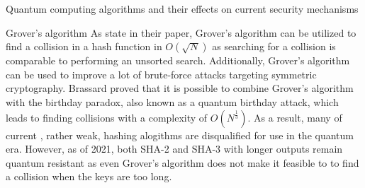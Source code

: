 \documentclass[aps,preprintnumbers,twocolumn]{revtex4}
\begin{document}
\begin{section}{Quantum computing algorithms and their effects on current security mechanisms}
\begin{subsection}{Grover's algorithm}
As \cite{DBLP:journals/corr/abs-1804-00200} state in their paper, Grover's algorithm can be utilized to find a collision in a hash function in $O(\sqrt{N})$ as searching for a collision is comparable to performing an unsorted search. 
Additionally, Grover's algorithm can be used to improve a lot of brute-force attacks targeting symmetric cryptography.
Brassard proved \cite{1998} that it is possible to combine Grover's algorithm with the birthday paradox, 
also known as a quantum birthday attack, which leads to finding collisions with a complexity of $O(N^{\frac{1}{3}})$.
As a result, many of current , rather weak, hashing alogithms are disqualified for use in the quantum era. 
However, as of 2021, both SHA-2 and SHA-3 with longer outputs remain quantum resistant as even Grover's algorithm does not make it feasible to to find a collision when the keys are too long.
\end{subsection}

\end{section}
\end{document}
